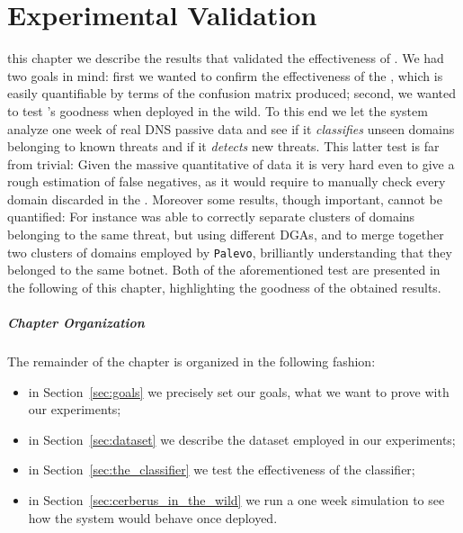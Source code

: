 \chapter{Experimental Validation} %
\label{chap:validation}
 this chapter we describe the results that validated the effectiveness of \thesystem.
We had two goals in mind: first we wanted to confirm the effectiveness of the
, which is easily quantifiable by terms of the
confusion matrix produced; second, we wanted to test \thesystem's goodness
when deployed in the wild.
To this end we let the system
analyze one week of real DNS passive data and see if it \emph{classifies} unseen domains belonging to known threats and if it \emph{detects} new threats.
This latter test is far from trivial: Given the
massive quantitative of data it is very hard even to give a rough estimation
of false negatives, as it would require to manually check every domain discarded
in the . Moreover some results, though important,
cannot be quantified: For instance \thesystem was able to correctly separate
clusters of domains belonging to the same threat, but using different DGAs, and
to merge together two clusters of domains employed by \texttt{Palevo}, brilliantly understanding that they belonged to the same botnet.
Both of the
aforementioned test are presented in the following of this chapter, highlighting
the goodness of the obtained results.
\paragraph{Chapter Organization} The remainder of the chapter is organized in
the following fashion:
\begin{itemize}
\item in Section~\ref{sec:goals} we precisely set our goals, what we want to
prove with our experiments;
\item in Section~\ref{sec:dataset} we describe the dataset employed in our
experiments;
\item in Section~\ref{sec:the_classifier} we test the effectiveness of the
classifier;
\item in Section~\ref{sec:cerberus_in_the_wild} we run a one week simulation
to see how the system would behave once deployed.
\end{itemize}
\newpage
